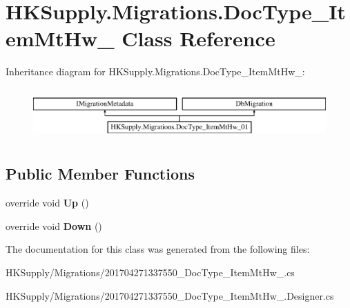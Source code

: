 \hypertarget{class_h_k_supply_1_1_migrations_1_1_doc_type___item_mt_hw__01}{}\section{H\+K\+Supply.\+Migrations.\+Doc\+Type\+\_\+\+Item\+Mt\+Hw\+\_ Class Reference}
\label{class_h_k_supply_1_1_migrations_1_1_doc_type___item_mt_hw__01}
Inheritance diagram for H\+K\+Supply.\+Migrations.\+Doc\+Type\+\_\+\+Item\+Mt\+Hw\+\_\+:\begin{figure}[H]
\begin{center}
\leavevmode
\includegraphics[height=2.000000cm]{class_h_k_supply_1_1_migrations_1_1_doc_type___item_mt_hw__01}
\end{center}
\end{figure}
\subsection*{Public Member Functions}
\begin{DoxyCompactItemize}
\item 
\mbox{\label{class_h_k_supply_1_1_migrations_1_1_doc_type___item_mt_hw__01_a19d2de7a77ce598834b6ee70dc5eb669}} 
override void {\bfseries Up} ()
\item 
\mbox{\label{class_h_k_supply_1_1_migrations_1_1_doc_type___item_mt_hw__01_ad6377f43a755920e7a213db4b8215751}} 
override void {\bfseries Down} ()
\end{DoxyCompactItemize}


The documentation for this class was generated from the following files\+:\begin{DoxyCompactItemize}
\item 
H\+K\+Supply/\+Migrations/201704271337550\+\_\+\+Doc\+Type\+\_\+\+Item\+Mt\+Hw\+\_.\+cs\item 
H\+K\+Supply/\+Migrations/201704271337550\+\_\+\+Doc\+Type\+\_\+\+Item\+Mt\+Hw\+\_.\+Designer.\+cs\end{DoxyCompactItemize}
